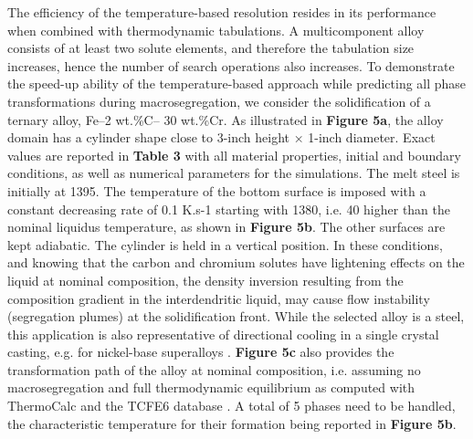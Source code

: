 The efficiency of the temperature-based resolution resides in its performance when combined with 
thermodynamic tabulations. A multicomponent alloy consists of at least two solute elements, and 
therefore the tabulation size increases, hence the number of search operations also increases. 
To demonstrate the speed-up ability of the temperature-based approach while predicting all phase 
transformations during macrosegregation, we consider the solidification of a ternary alloy, Fe–2 wt.\%C– 30 wt.\%Cr. 
As illustrated in \textbf{Figure 5a}, the alloy domain has a cylinder shape close to 3-inch height × 1-inch diameter. 
Exact values are reported in \textbf{Table 3} with all material properties, initial and boundary conditions, 
as well as numerical parameters for the simulations. The melt steel is initially at \SI{1395}{\udegC}. The 
temperature of the bottom surface is imposed with a constant decreasing rate of 0.1 K.s-1 starting 
with \SI{1380}{\udegC}, i.e. \SI{40}{\udegC} higher than the nominal liquidus temperature, as shown 
in \textbf{Figure 5b}. The other surfaces are kept adiabatic. The cylinder is held in a vertical position. 
In these conditions, and knowing that the carbon and chromium solutes have lightening effects on the liquid 
at nominal composition, the density inversion resulting from the composition gradient in the interdendritic 
liquid, may cause flow instability (segregation plumes) at the solidification front. While the selected alloy 
is a steel, this application is also representative of directional cooling in a single crystal casting, e.g. 
for nickel-base superalloys \cite{beckermann_development_2000}. \textbf{Figure 5c} also provides the 
transformation path of the alloy at nominal composition, i.e. assuming no macrosegregation and full 
thermodynamic equilibrium as computed with ThermoCalc and the TCFE6 database \cite{thermo-calc_andersson, tcfe6}. 
A total of 5 phases need to be handled, the characteristic temperature for their formation being reported 
in \textbf{Figure 5b}. 
 
